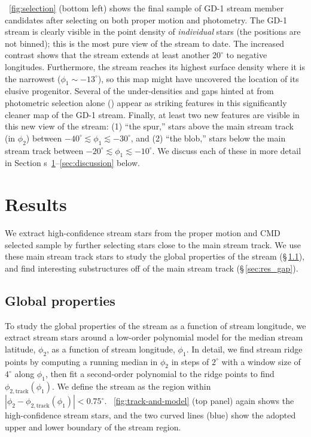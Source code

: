 \documentclass[modern]{aastex62}
\newcommand{\sectionname}{Section}
\begin{document}
\figurename~\ref{fig:selection} (bottom left) shows the final sample of GD-1
stream member candidates after selecting on both proper motion and photometry.
The GD-1 stream is clearly visible in the point density of \emph{individual} stars (the
positions are not binned); this is the most pure view of the stream to date.
The increased contrast shows that the stream extends at least another $20^\circ$
to negative longitudes.
Furthermore, the stream reaches its highest surface density where it is the narrowest ($\phi_1\sim-13^\circ$), so this map might have uncovered the location of its elusive progenitor.
Several of the under-densities and gaps hinted at from photometric selection
alone (\citealt{Koposov:2010, Carlberg:2013}) appear as striking features in
this significantly cleaner map of the GD-1 stream.
Finally, at least two new features are visible in this new view of the stream:
(1) ``the spur,'' stars above the main stream track (in $\phi_2$) between
$-40^\circ \lesssim \phi_1 \lesssim -30^\circ$, and (2) ``the blob,'' stars
below the main stream track between $-20^\circ \lesssim \phi_1 \lesssim
-10^\circ$.
We discuss each of these in more detail in \sectionname
s~\ref{sec:results}--\ref{sec:discussion} below.


\section{Results}
\label{sec:results}

We extract high-confidence stream stars from the proper motion and CMD selected
sample by further selecting stars close to the main stream track.
We use these main stream track stars to study the global properties of the
stream (\S\,\ref{sec:res_global}), and find interesting substructures off of the main stream track (\S\,\ref{sec:res_gap}).

\subsection{Global properties}
\label{sec:res_global}

To study the global properties of the stream as a function of stream longitude,
we extract stream stars around a low-order polynomial model for the median
stream latitude, $\phi_2$, as a function of stream longitude, $\phi_1$.
In detail, we find stream ridge points by computing a running median in $\phi_2$
in steps of $2^\circ$ with a window size of $4^\circ$ along $\phi_1$, then fit a
second-order polynomial to the ridge points to find $\phi_{2,
\textrm{track}}(\phi_1)$.
We define the stream as the region within $\left| \phi_2 - \phi_{2,
\textrm{track}}(\phi_1) \right| < 0.75^\circ$.
\figurename~\ref{fig:track-and-model} (top panel) again shows the
high-confidence stream stars, and the two curved lines (blue) show the adopted
upper and lower boundary of the stream region.
\end{document}
